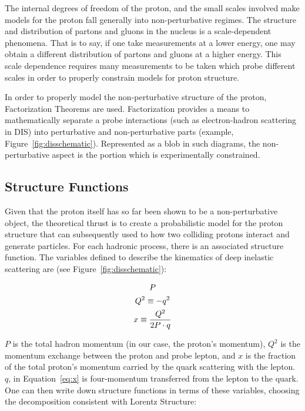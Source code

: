 The internal degrees of freedom of the proton, and the small scales involved
make models for the proton fall generally into non-perturbative regimes.  The
structure and distribution of partons and gluons in the nucleus is a
scale-dependent phenomena. That is to say, if one take measurements at a lower
energy, one may obtain a different distribution of partons and gluons at a
higher energy. This scale dependence requires many measurements to be taken
which probe different scales in order to properly constrain models for proton
structure. 

In order to properly model the non-perturbative structure of the proton,
Factorization Theorems are used. Factorization provides a means to
mathematically separate a probe interactions (such as electron-hadron scattering
in DIS) into perturbative and non-perturbative parts (example,
Figure~\ref{fig:disschematic}). Represented as a blob in such diagrams, the
non-perturbative aspect is the portion which is experimentally constrained.

\subsection{Structure Functions}
\label{sec:structure_functions}

Given that the proton itself has so far been shown to be a non-perturbative
object, the theoretical thrust is to create a probabilistic model for the proton
structure that can subsequently used to how two colliding protons interact and
generate particles. For each hadronic process, there is an associated structure
function. The variables defined to describe the kinematics of deep inelastic
scattering are (see Figure~\ref{fig:disschematic}):

\begin{gather}
  P \label{eq:P}\\
  Q^2 \equiv -q^2 \label{eq:big_q_sq}\\
  x \equiv { Q^2 \over {2P\cdot q} } \label{eq:x}
\end{gather}

{\noindent}$P$ is the total hadron momentum (in our case, the proton's
momentum), $Q^2$ is the momentum exchange between the proton and probe lepton,
and $x$ is the fraction of the total proton's momentum carried by the quark
scattering with the lepton.  $q$, in Equation~\ref{eq:x} is four-momentum
transferred from the lepton to the quark. \\

{\noindent}One can then write down structure functions in terms of these
variables, choosing the decomposition consistent with Lorentz Structure:

